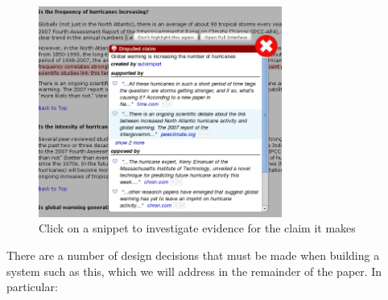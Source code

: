 \documentclass{www2010-submission}
\begin{document}
\begin{figure}[tb]
	\begin{center}
	\includegraphics[width=8cm]{../screenshots/v2_popup_dim2.png}
	\caption{Click on a snippet to investigate evidence for the claim it makes}
	\label{claimview}
	\end{center}
\end{figure}

There are a number of design decisions that must be made when building a system such as this, which we will address in the remainder of the paper. In particular:
\end{document}
